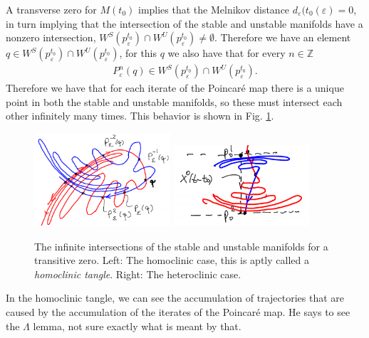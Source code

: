 A transverse zero for $M(t_0)$ implies that the Melnikov distance $d_{\varepsilon }(t_{0}(\varepsilon)=0$, in turn implying that the intersection of the stable and unstable manifolds have a nonzero intersection, $W^{S}(p_{\varepsilon}^{t_0}) \cap W^{U}(p_{\varepsilon}^{t_0}) \neq \emptyset$. Therefore we have an element $q\in W^{S}(p_{\varepsilon}^{t_0}) \cap W^{U}(p_{\varepsilon}^{t_0})$, for this $q$ we also have that for every $n \in \mathbb{Z}$
\begin{align}
	P_{\varepsilon}^{n}(q) \in W^{S}(p_{\varepsilon}^{t_0}) \cap W^{U}(p_{\varepsilon}^{t_0}). 
\end{align}
Therefore we have that for each iterate of the Poincaré map there is a unique point in both the stable and unstable manifolds, so these must intersect each other infinitely many times. This behavior is shown in Fig. \ref{fig:inf_intersections}. 
\begin{figure}[h!]
	\centering
	\includegraphics[width=0.45\textwidth]{figures/ch6/11inf_intersection_hetero.png}
	\includegraphics[width=0.45\textwidth]{figures/ch6/11inf_intersection_homo.png}
	\caption{The infinite intersections of the stable and unstable manifolds for a transitive zero. Left: The homoclinic case, this is aptly called a \emph{homoclinic tangle}. Right: The heteroclinic case.}
	\label{fig:inf_intersections}
\end{figure}
In the homoclinic tangle, we can see the accumulation of trajectories that are caused by the accumulation of the iterates of the Poincaré map. {\color{blue} He says to see the $\Lambda$ lemma, not sure exactly what is meant by that.}

